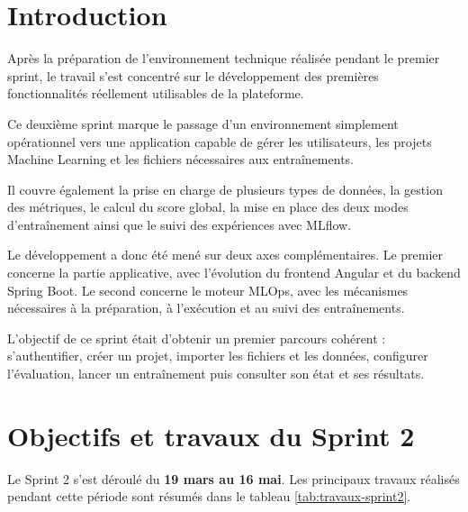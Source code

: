 \section{Introduction}
\label{sec:ch4-introduction}

Après la préparation de l'environnement technique réalisée pendant le
premier sprint, le travail s'est concentré sur le développement des
premières fonctionnalités réellement utilisables de la plateforme.

Ce deuxième sprint marque le passage d'un environnement simplement
opérationnel vers une application capable de gérer les utilisateurs,
les projets Machine Learning et les fichiers nécessaires aux
entraînements.

Il couvre également la prise en charge de plusieurs types de données,
la gestion des métriques, le calcul du score global, la mise en place
des deux modes d'entraînement ainsi que le suivi des expériences avec
MLflow.

Le développement a donc été mené sur deux axes complémentaires. Le
premier concerne la partie applicative, avec l'évolution du frontend
Angular et du backend Spring Boot. Le second concerne le moteur MLOps,
avec les mécanismes nécessaires à la préparation, à l'exécution et au
suivi des entraînements.

L'objectif de ce sprint était d'obtenir un premier parcours cohérent :
s'authentifier, créer un projet, importer les fichiers et les données,
configurer l'évaluation, lancer un entraînement puis consulter son état
et ses résultats.



\section{Objectifs et travaux du Sprint 2}
\label{sec:sprint2-objectifs}

Le Sprint 2 s'est déroulé du \textbf{19 mars au 16 mai}. Les principaux
travaux réalisés pendant cette période sont résumés dans le tableau
\ref{tab:travaux-sprint2}.

